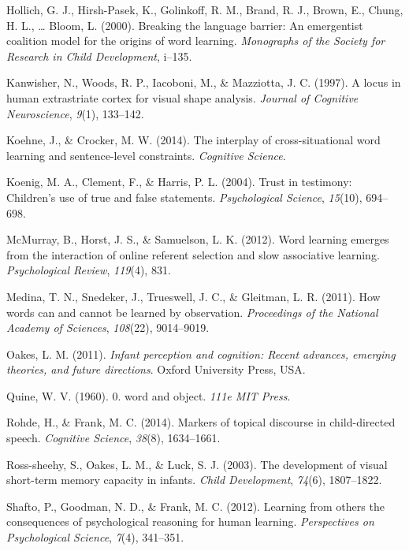 \documentclass[authoryear, review]{elsarticle}
\begin{document}
\hypertarget{ref-hollich2000breaking}{}
Hollich, G. J., Hirsh-Pasek, K., Golinkoff, R. M., Brand, R. J., Brown,
E., Chung, H. L., \ldots{} Bloom, L. (2000). Breaking the language
barrier: An emergentist coalition model for the origins of word
learning. \emph{Monographs of the Society for Research in Child
Development}, i--135.

\hypertarget{ref-kanwisher1997locus}{}
Kanwisher, N., Woods, R. P., Iacoboni, M., \& Mazziotta, J. C. (1997). A
locus in human extrastriate cortex for visual shape analysis.
\emph{Journal of Cognitive Neuroscience}, \emph{9}(1), 133--142.

\hypertarget{ref-koehne2014interplay}{}
Koehne, J., \& Crocker, M. W. (2014). The interplay of cross-situational
word learning and sentence-level constraints. \emph{Cognitive Science}.

\hypertarget{ref-koenig2004trust}{}
Koenig, M. A., Clement, F., \& Harris, P. L. (2004). Trust in testimony:
Children's use of true and false statements. \emph{Psychological
Science}, \emph{15}(10), 694--698.

\hypertarget{ref-mcmurray2012word}{}
McMurray, B., Horst, J. S., \& Samuelson, L. K. (2012). Word learning
emerges from the interaction of online referent selection and slow
associative learning. \emph{Psychological Review}, \emph{119}(4), 831.

\hypertarget{ref-medina2011words}{}
Medina, T. N., Snedeker, J., Trueswell, J. C., \& Gleitman, L. R.
(2011). How words can and cannot be learned by observation.
\emph{Proceedings of the National Academy of Sciences}, \emph{108}(22),
9014--9019.

\hypertarget{ref-oakes2011infant}{}
Oakes, L. M. (2011). \emph{Infant perception and cognition: Recent
advances, emerging theories, and future directions}. Oxford University
Press, USA.

\hypertarget{ref-quine19600}{}
Quine, W. V. (1960). 0. word and object. \emph{111e MIT Press}.

\hypertarget{ref-rohde2014markers}{}
Rohde, H., \& Frank, M. C. (2014). Markers of topical discourse in
child-directed speech. \emph{Cognitive Science}, \emph{38}(8),
1634--1661.

\hypertarget{ref-ross2003development}{}
Ross-sheehy, S., Oakes, L. M., \& Luck, S. J. (2003). The development of
visual short-term memory capacity in infants. \emph{Child Development},
\emph{74}(6), 1807--1822.

\hypertarget{ref-shafto2012learning}{}
Shafto, P., Goodman, N. D., \& Frank, M. C. (2012). Learning from others
the consequences of psychological reasoning for human learning.
\emph{Perspectives on Psychological Science}, \emph{7}(4), 341--351.
\end{document}
